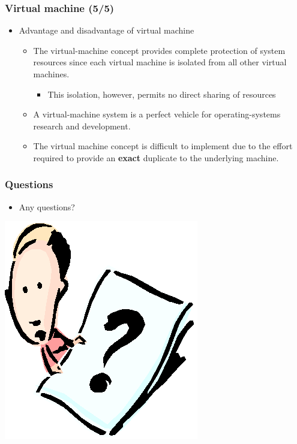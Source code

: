 \documentclass[CJKutf8,xcolor=pdftex,dvipsnames,table]{beamer}
\begin{document}
\begin{CJK*}{UTF8}{song}
  
  \begin{frame}
    \frametitle{Virtual machine (5/5)} \pause
    \begin{itemize}
    \item{Advantage and disadvantage of virtual machine} \pause
      \begin{itemize}
      \item{The virtual-machine concept provides complete protection of system resources since each virtual machine is isolated from all other virtual machines.} \pause
        \begin{itemize}
        \item{This isolation, however, permits no direct sharing of resources} \pause
        \end{itemize}
      \item{A virtual-machine system is a perfect vehicle for operating-systems research and development.} \pause
      \item{The virtual machine concept is difficult to implement due to the effort required to provide an \textbf{exact} duplicate to the underlying machine.}
      \end{itemize}
    \end{itemize}
  \end{frame}
  
  \begin{frame}
    \frametitle{Questions}
    \begin{itemize}
    \item{Any questions?}
    \end{itemize}
    \begin{center}
      \includegraphics[scale=.5]{question}
    \end{center}
  \end{frame}


\end{CJK*}
\end{document}
